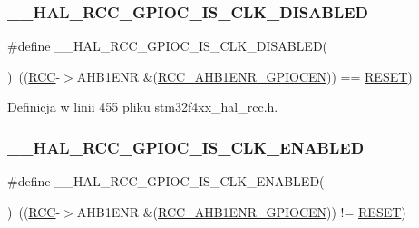\subsubsection{\texorpdfstring{\+\_\+\+\_\+\+H\+A\+L\+\_\+\+R\+C\+C\+\_\+\+G\+P\+I\+O\+C\+\_\+\+I\+S\+\_\+\+C\+L\+K\+\_\+\+D\+I\+S\+A\+B\+L\+ED}{\_\_HAL\_RCC\_GPIOC\_IS\_CLK\_DISABLED}}
{\footnotesize\ttfamily \#define \+\_\+\+\_\+\+H\+A\+L\+\_\+\+R\+C\+C\+\_\+\+G\+P\+I\+O\+C\+\_\+\+I\+S\+\_\+\+C\+L\+K\+\_\+\+D\+I\+S\+A\+B\+L\+ED(\begin{DoxyParamCaption}{ }\end{DoxyParamCaption})~((\hyperlink{group___peripheral__declaration_ga74944438a086975793d26ae48d5882d4}{R\+CC}-\/$>$A\+H\+B1\+E\+NR \&(\hyperlink{group___peripheral___registers___bits___definition_gae8a8b42e33aef2a7bc2d41ad9d231733}{R\+C\+C\+\_\+\+A\+H\+B1\+E\+N\+R\+\_\+\+G\+P\+I\+O\+C\+EN})) == \hyperlink{group___exported__types_gga89136caac2e14c55151f527ac02daaffa589b7d94a3d91d145720e2fed0eb3a05}{R\+E\+S\+ET})}



Definicja w linii 455 pliku stm32f4xx\+\_\+hal\+\_\+rcc.\+h.

\mbox{\label{group___r_c_c___a_h_b1___peripheral___clock___enable___disable___status_ga528029c120a0154dfd7cfd6159e8debe}} 
\subsubsection{\texorpdfstring{\+\_\+\+\_\+\+H\+A\+L\+\_\+\+R\+C\+C\+\_\+\+G\+P\+I\+O\+C\+\_\+\+I\+S\+\_\+\+C\+L\+K\+\_\+\+E\+N\+A\+B\+L\+ED}{\_\_HAL\_RCC\_GPIOC\_IS\_CLK\_ENABLED}}
{\footnotesize\ttfamily \#define \+\_\+\+\_\+\+H\+A\+L\+\_\+\+R\+C\+C\+\_\+\+G\+P\+I\+O\+C\+\_\+\+I\+S\+\_\+\+C\+L\+K\+\_\+\+E\+N\+A\+B\+L\+ED(\begin{DoxyParamCaption}{ }\end{DoxyParamCaption})~((\hyperlink{group___peripheral__declaration_ga74944438a086975793d26ae48d5882d4}{R\+CC}-\/$>$A\+H\+B1\+E\+NR \&(\hyperlink{group___peripheral___registers___bits___definition_gae8a8b42e33aef2a7bc2d41ad9d231733}{R\+C\+C\+\_\+\+A\+H\+B1\+E\+N\+R\+\_\+\+G\+P\+I\+O\+C\+EN})) != \hyperlink{group___exported__types_gga89136caac2e14c55151f527ac02daaffa589b7d94a3d91d145720e2fed0eb3a05}{R\+E\+S\+ET})}



